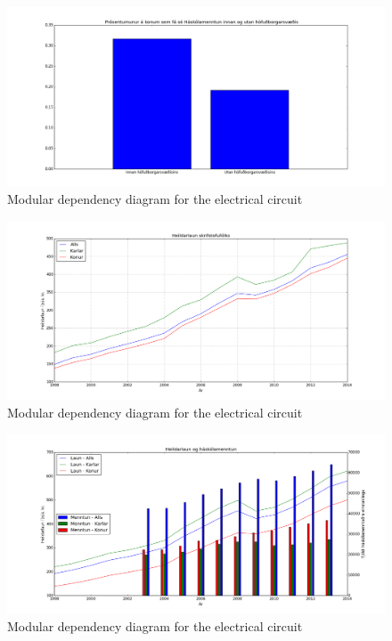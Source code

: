 \documentclass[12pt, svn, draft]{rureport}
\begin{document}
\begin{figure}
	\centering 
	\includegraphics[width=\textwidth]{../graphics/Haskolamentun_konur_innan_utan_hs.png}
	\caption{Modular dependency diagram for the electrical circuit \label{fig:menntunkonur}}
\end{figure}

\begin{figure}
	\centering 
	\includegraphics[width=\textwidth]{graphics/heildar_laun.png}
	\caption{Modular dependency diagram for the electrical circuit \label{fig:heildarlaun}}
\end{figure}

\begin{figure}
	\centering 
	\includegraphics[width=\textwidth]{graphics/heildar_laun_og_haskolamentun.png}
	\caption{Modular dependency diagram for the electrical circuit \label{fig:heildarhask}}
\end{figure}
\end{document}
